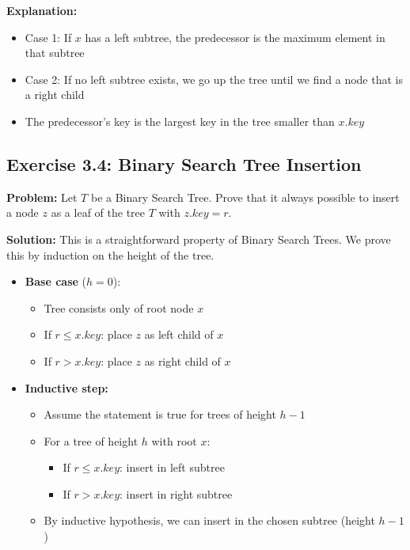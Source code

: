 \textbf{Explanation:}
\begin{itemize}
    \item Case 1: If $x$ has a left subtree, the predecessor is the maximum element in that subtree
    \item Case 2: If no left subtree exists, we go up the tree until we find a node that is a right child
    \item The predecessor's key is the largest key in the tree smaller than $x.key$
\end{itemize}

\subsection{Exercise 3.4: Binary Search Tree Insertion}
\textbf{Problem:} Let $T$ be a Binary Search Tree. Prove that it always possible to insert a node $z$ as a leaf of the tree $T$ with $z.key = r$.

\textbf{Solution:} This is a straightforward property of Binary Search Trees. We prove this by induction on the height of the tree.

\begin{itemize}
\item \textbf{Base case} ($h = 0$):
    \begin{itemize}
        \item Tree consists only of root node $x$
        \item If $r \leq x.key$: place $z$ as left child of $x$
        \item If $r > x.key$: place $z$ as right child of $x$
    \end{itemize}

\item \textbf{Inductive step:}
    \begin{itemize}
        \item Assume the statement is true for trees of height $h-1$
        \item For a tree of height $h$ with root $x$:
        \begin{itemize}
            \item If $r \leq x.key$: insert in left subtree
            \item If $r > x.key$: insert in right subtree
        \end{itemize}
        \item By inductive hypothesis, we can insert in the chosen subtree (height $h-1$)
    \end{itemize}
\end{itemize}

